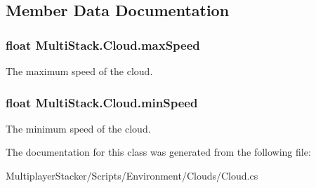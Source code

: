 \subsection{Member Data Documentation}
\hypertarget{class_multi_stack_1_1_cloud_ad665595ffaaa5c7b5c6d5a7222d40c89}{}
\subsubsection[{max\+Speed}]{\setlength{\rightskip}{0pt plus 5cm}float Multi\+Stack.\+Cloud.\+max\+Speed}\label{class_multi_stack_1_1_cloud_ad665595ffaaa5c7b5c6d5a7222d40c89}


The maximum speed of the cloud. 

\hypertarget{class_multi_stack_1_1_cloud_a41c5aba0ae109496d637a7e08c726171}{}
\subsubsection[{min\+Speed}]{\setlength{\rightskip}{0pt plus 5cm}float Multi\+Stack.\+Cloud.\+min\+Speed}\label{class_multi_stack_1_1_cloud_a41c5aba0ae109496d637a7e08c726171}


The minimum speed of the cloud. 



The documentation for this class was generated from the following file\+:\begin{DoxyCompactItemize}
\item 
Multiplayer\+Stacker/\+Scripts/\+Environment/\+Clouds/Cloud.\+cs\end{DoxyCompactItemize}

